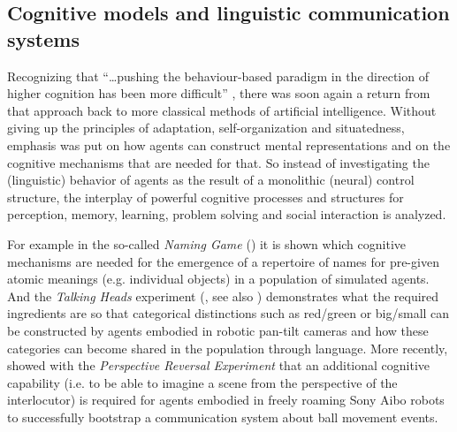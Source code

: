 \subsection{Cognitive models and linguistic communication systems}

Recognizing that ``\dots pushing the behaviour-based paradigm in the
direction of higher cognition has been more difficult''
\cite[p. 2381]{steels03intelligence}, there was soon again a return
from that approach back to more classical methods of artificial
intelligence. Without giving up the principles of adaptation,
self-organization and situatedness, emphasis was put on how agents can
construct mental representations and on the cognitive mechanisms that
are needed for that. So instead of investigating the (linguistic)
behavior of agents as the result of a monolithic (neural) control
structure, the interplay of powerful cognitive processes and
structures for perception, memory, learning, problem solving and
social interaction is analyzed.

For example in the so-called \emph{Naming Game}
(\citealp{steels95selforganizing,steels99spatially}) it is shown which
cognitive mechanisms are needed for the emergence of a repertoire of
names for pre-given atomic meanings (e.g. individual objects) in a
population of simulated agents. And the \emph{Talking Heads}
experiment (\citealp{steels98origins}, see also
\citealp{steels99situated,steels99collective,steels02bootstrapping})
demonstrates what the required ingredients are so that categorical
distinctions such as red/green or big/small can be constructed by
agents embodied in robotic pan-tilt cameras and how these categories
can become shared in the population through language.  More recently,
\cite*{steels09perspective-alignment,loetzsch08typological} showed
with the \emph{Perspective Reversal Experiment} that an additional
cognitive capability (i.e. to be able to imagine a scene from the
perspective of the interlocutor) is required for agents embodied in
freely roaming Sony Aibo robots to successfully bootstrap a communication
system about ball movement events.

